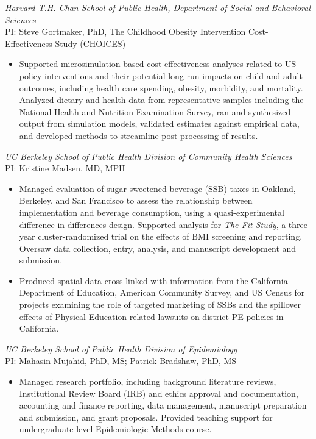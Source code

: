 \documentclass{cv_style}
\begin{document}
\textit{Harvard T.H. Chan School of Public Health, Department of Social and Behavioral Sciences} \\
PI: Steve Gortmaker, PhD, The Childhood Obesity Intervention Cost-Effectiveness Study (CHOICES)
\begin{itemize}
    \item Supported microsimulation-based cost-effectiveness analyses related to US policy interventions and their potential long-run impacts on child and adult outcomes, including health care spending, obesity, morbidity, and mortality. Analyzed dietary and health data from representative samples including the National Health and Nutrition Examination Survey, ran and synthesized output from simulation models, validated estimates against empirical data, and developed methods to streamline post-processing of results.
\end{itemize}

\textit{UC Berkeley School of Public Health Division of Community Health Sciences} \\
PI: Kristine Madsen, MD, MPH
\begin{itemize}
    \item Managed evaluation of sugar-sweetened beverage (SSB) taxes in Oakland, Berkeley, and San Francisco to assess the relationship between implementation and beverage consumption, using a quasi-experimental difference-in-differences design. Supported analysis for \textit{The Fit Study}, a three year cluster-randomized trial on the effects of BMI screening and reporting. Oversaw data collection, entry, analysis, and manuscript development and submission.
    \item \parskip 1pt Produced spatial data cross-linked with information from the California Department of Education, American Community Survey, and US Census for projects examining the role of targeted marketing of SSBs and the spillover effects of Physical Education related lawsuits on district PE policies in California.
\end{itemize}

\textit{UC Berkeley School of Public Health Division of Epidemiology} \\
PI: Mahasin Mujahid, PhD, MS; Patrick Bradshaw, PhD, MS
\begin{itemize}
    \item Managed research portfolio, including background literature reviews, Institutional Review Board (IRB) and ethics approval and documentation, accounting and finance reporting, data management, manuscript preparation and submission, and grant proposals. Provided teaching support for undergraduate-level Epidemiologic Methods course.
\end{itemize}
\end{document}
